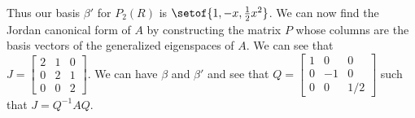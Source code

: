 \documentclass[answers,12pt,addpoints]{exam}
\begin{document}
\begin{questions}
\begin{solution}
            Thus our basis $\beta'$ for $P_2(R)$ is $\setof{1, -x, \frac{1}{2}x^2}$. We can now find the Jordan canonical form of $A$ by constructing the matrix $P$ whose columns are the basis vectors of the generalized eigenspaces of $A$.
            We can see that $J = \begin{bmatrix}
                2 & 1 & 0 \\
                0 & 2 & 1 \\
                0 & 0 & 2
            \end{bmatrix}$. We can have $\beta$ and $\beta'$ and see that $Q = \begin{bmatrix}
                1 & 0 & 0 \\
                0 & -1 & 0 \\
                0 & 0 & 1/2
            \end{bmatrix}$ such that $J = Q^{-1}AQ$.
    \end{solution}


\end{questions}
\end{document}
